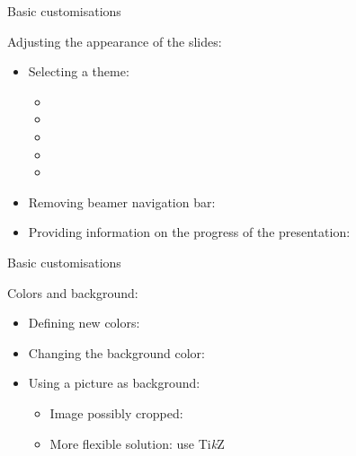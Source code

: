 \begin{frame}{Basic customisations}

	Adjusting the appearance of the slides:
	\begin{itemize}\bigsep 
		\item Selecting a theme: 
			\begin{multicols}{2}
				\begin{itemize}
			\item {}
			\item {}
			\item {}
			\item {}
			\item {}	
				\end{itemize}
			\end{multicols}
	\item Removing beamer navigation bar: 
	\item Providing information on the progress of the presentation: {\small {}}
	\end{itemize}
\end{frame}

\begin{frame}{Basic customisations}

	Colors and background:
	\begin{itemize}\bigsep 
		\item Defining new colors: 
		\item Changing the background color:\\
		\item Using a picture as background:
			\begin{itemize}
				\item Image possibly cropped: 
				\item More flexible solution: use Ti{\em k}Z
		\end{itemize}
			
	\end{itemize}
\end{frame}

